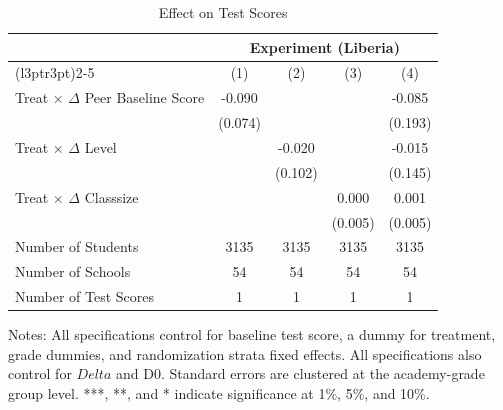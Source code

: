\begin{table}[!h]
\centering\centering\centering
\caption{Effect on Test Scores}
\centering
\begin{threeparttable}
\fontsize{10}{12}\selectfont
\begin{tabular}[t]{lcccc}
\toprule
\multicolumn{1}{c}{ } & \multicolumn{4}{c}{Experiment (Liberia)} \\
\cmidrule(l{3pt}r{3pt}){2-5}
  & (1) & (2) & (3) & (4)\\
\midrule
Treat $\times$ $\Delta$ Peer Baseline Score & -0.090 &  &  & -0.085\\
 & (0.074) &  &  & (0.193)\\
Treat $\times$ $\Delta$ Level &  & -0.020 &  & -0.015\\
 &  & (0.102) &  & (0.145)\\
Treat $\times$ $\Delta$ Classsize &  &  & 0.000 & 0.001\\
 &  &  & (0.005) & (0.005)\\
\hline
\midrule
Number of Students & 3135 & 3135 & 3135 & 3135\\
Number of Schools & 54 & 54 & 54 & 54\\
Number of Test Scores & 1 & 1 & 1 & 1\\
\bottomrule
\end{tabular}
\begin{tablenotes}[para]
\item Notes: All specifications control for baseline test score, a dummy for treatment, grade dummies, and randomization strata fixed effects. All specifications also control for $Delta$ and D0. Standard errors are clustered at the academy-grade group level. ***, **,            and * indicate significance at 1\%, 5\%, and 10\%.
\end{tablenotes}
\end{threeparttable}
\end{table}
